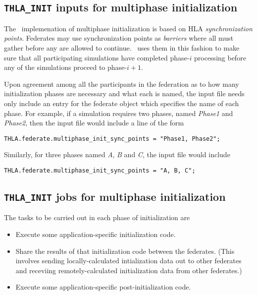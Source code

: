 \subsection{{\tt THLA\_INIT} inputs for multiphase initialization}

The \TrickHLA\ implemenation of multiphase initialization is based on
HLA {\em synchronization points}.
Federates may use synchronization points as {\em barriers} where all must
gather before any are allowed to continue.
\TrickHLA\ uses them in this fashion to make sure that all participating
simulations have completed phase-$i$ processing before any of the
simulations proceed to phase-$i+1$.

Upon agreement among all the participants in the federation as to how
many initialization phases are necessary and what each is named,
the input file needs only include an entry for the federate object
which specifies the name of each phase.
For example, if a simulation requires two phases, named {\em Phase1}
and {\em Phase2}, then the input file would include a line of the form

\begin{verbatim}
THLA.federate.multiphase_init_sync_points = "Phase1, Phase2";
\end{verbatim}

Similarly, for three phases named {\em A}, {\em B} and {\em C},
the input file would include

\begin{verbatim}
THLA.federate.multiphase_init_sync_points = "A, B, C";
\end{verbatim}


\subsection{{\tt THLA\_INIT} jobs for multiphase initialization}

The tasks to be carried out in each phase of initialization are
\begin{itemize}
\item{
  Execute some application-specific initialization code.
}
\item{
  Share the results of that initialization code between the federates.
  (This involves sending locally-calculated intialization data out to
  other federates and receviing remotely-calculated initialization data
  from other federates.)
}
\item{
  Execute some application-specific post-initialization code.
}
\end{itemize}

